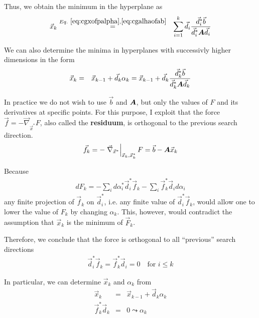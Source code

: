 \documentclass[11pt,a4paper]{report}
\begin{document}
Thus, we obtain the minimum in the hyperplane as 
\begin{eqnarray}
\vec{x}_k&
\stackrel{Eq.~\ref{eq:cgxofpalpha},\ref{eq:cgalhaofab}}{=}
&\sum_{i=1}^k\vec{d}_i
\frac{\vec{d}^*_i\vec{b}}{\vec{d}^*_i\bm{A}\vec{d}_i}
\end{eqnarray}

We can also determine the minima in hyperplanes with successivly  
higher dimensions in the form
\begin{eqnarray}
\vec{x}_k&=&
\vec{x}_{k-1}+\vec{d}_k\alpha_k
=\vec{x}_{k-1}+\vec{d}_k
\frac{\vec{d}^*_k\vec{b}}{\vec{d}^*_k\bm{A}\vec{d}_k}
\end{eqnarray}

In practice we do not wish to use $\vec{b}$ and $\bm{A}$, but only
the values of $F$ and its derivatives at specific points. For this
purpose, I exploit that the force
$\vec{f}=-\vec{\nabla}_{\vec{x}^*}F$, also called the
\textbf{residuum}, is orthogonal to the previous
search direction.
\begin{eqnarray}
\vec{f}_k=-\left.\vec{\nabla}_{\vec{x}^*}\right|_{\vec{x}_k,\vec{x}_k^*} F
=\vec{b}-\bm{A}\vec{x}_k
\label{eq:cgforceofab}
\end{eqnarray}

Because
\begin{eqnarray}
dF_k=
-\sum_i d\alpha_i^* \vec{d}_i^* \vec{f}_k
-\sum_i \vec{f}_k^* \vec{d}_id\alpha_i
\end{eqnarray}
any finite projection of $\vec{f}_k$ on $\vec{d}_i^*$, i.e. any
finite value of $\vec{d}^*_i\vec{f}_k$, would allow one to lower the
value of $F_k$ by changing $\alpha_k$. This, however, would contradict
the assumption that $\vec{x}_k$ is the minimum of $\vec{F}_k$.

Therefore, we conclude that the force is orthogonal to all ``previous''
search directions
\begin{eqnarray}
\vec{d}_i^*\vec{f}_k=\vec{f}_k^*\vec{d}_i=0\quad\text{for $i\le k$}
\label{eq:cgorthogonalityforceandsearch}
\end{eqnarray}

In particular, we can determine $\vec{x}_k$ and $\alpha_k$ from 
\begin{eqnarray}
\vec{x}_k&=&\vec{x}_{k-1}+\vec{d}_k\alpha_k
\label{eq:cgxkwithalphaka}
\\
\vec{f}_k^*\vec{d}_k&=&0\leadsto\alpha_k
\label{eq:cgxkwithalphakb}
\end{eqnarray}

\end{document}

